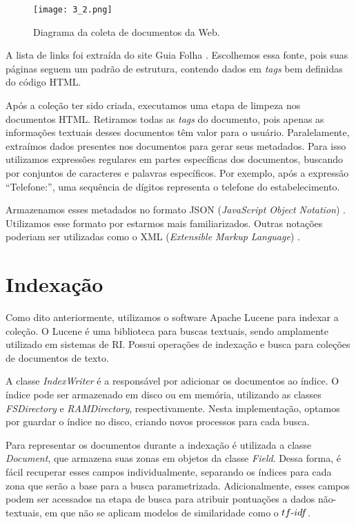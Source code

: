 \begin{figure}[!h]
  \centering
  \texttt{[image: 3\_2.png]} 
  \caption{Diagrama da coleta de documentos da Web.}
  \label{fig:diagcol} 
\end{figure}

A lista de links foi extraída do site Guia Folha \cite{GuiaFolha}. Escolhemos essa fonte, pois suas páginas seguem um padrão de estrutura, contendo dados em \emph{tags} bem definidas do código HTML. 

Após a coleção ter sido criada, executamos uma etapa de limpeza nos documentos HTML. Retiramos todas as \emph{tags} do documento, pois apenas as informações textuais desses documentos têm valor para o usuário. Paralelamente, extraímos dados presentes nos documentos para gerar seus metadados. Para isso utilizamos expressões regulares \cite{ExpRegulares} em partes específicas dos documentos, buscando por conjuntos de caracteres e palavras específicos. Por exemplo, após a expressão ``Telefone:'', uma sequência de dígitos representa o telefone do estabelecimento.

Armazenamos esses metadados no formato JSON (\emph{JavaScript Object Notation}) \cite{JSON}. Utilizamos esse formato por estarmos mais familiarizados. Outras notações poderiam ser utilizadas como o XML (\emph{Extensible Markup Language}) \cite{XML}.

\section{Indexação}
\label{sec:indexacao}

Como dito anteriormente, utilizamos o software Apache Lucene \cite{ApacheLucene} para indexar a coleção. O Lucene é uma biblioteca para buscas textuais, sendo amplamente utilizado em sistemas de RI. Possui operações de indexação e busca para coleções de documentos de texto.

A classe \emph{IndexWriter} \cite{IndexWriter} é a responsável por adicionar os documentos ao índice. O índice pode ser armazenado em disco ou em memória, utilizando as classes \emph{FSDirectory} e \emph{RAMDirectory}, respectivamente. Nesta implementação, optamos por guardar o índice no disco, criando novos processos para cada busca.

Para representar os documentos durante a indexação é utilizada a classe \emph{Document}, que armazena suas zonas em objetos da classe \emph{Field}. Dessa forma, é fácil recuperar esses campos individualmente, separando os índices para cada zona que serão a base para a busca parametrizada. Adicionalmente, esses campos podem ser acessados na etapa de busca para atribuir pontuações a dados não-textuais, em que não se aplicam modelos de similaridade como o $tf\textnormal{-}idf$.

